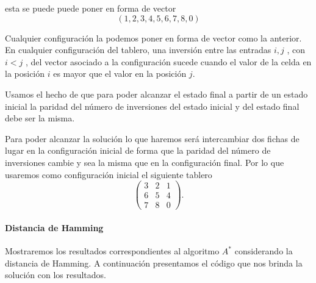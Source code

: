 \documentclass[11pt]{article}
\begin{document}
    esta se puede puede poner en forma de vector
\begin{equation*}(1,2,3,4,5,6,7,8,0)\end{equation*}

    Cualquier configuración la podemos poner en forma de vector como la
anterior. En cualquier configuración del tablero, una inversión entre
las entradas \(i,j\) , con \(i<j\) , del vector asociado a la
configuración sucede cuando el valor de la celda en la posición \(i\) es
mayor que el valor en la posición \(j\).

    Usamos el hecho de que para poder alcanzar el estado final a partir de un
estado inicial la paridad del número de inversiones del estado inicial y del estado final debe ser la misma.

    Para poder alcanzar la solución lo que haremos será intercambiar dos
fichas de lugar en la configuración inicial de forma que la paridad del
número de inversiones cambie y sea la misma que en la configuración
final. Por lo que usaremos como configuración inicial el siguiente
tablero
\begin{equation*}\begin{pmatrix}3&2&1\\ 6&5&4\\ 7&8&0 \end{pmatrix}.\end{equation*}

    \hypertarget{distancia-de-hamming}{%
\paragraph{Distancia de Hamming}\label{distancia-de-hamming}}

    Mostraremos los resultados correspondientes al algoritmo \(A^*\)
considerando la distancia de Hamming. A continuación presentamos el
código que nos brinda la solución con los resultados.
\end{document}
